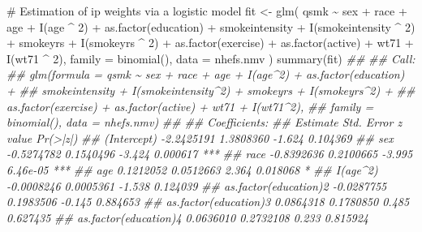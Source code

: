 \documentclass[
  10pt,
  a4paper,
]{book}
\newenvironment{Shaded}{\begin{snugshade}}{\end{snugshade}}
\newcommand{\AttributeTok}[1]{\textcolor[rgb]{0.40,0.45,0.13}{#1}}
\newcommand{\CommentTok}[1]{\textcolor[rgb]{0.37,0.37,0.37}{#1}}
\newcommand{\DecValTok}[1]{\textcolor[rgb]{0.68,0.00,0.00}{#1}}
\newcommand{\DocumentationTok}[1]{\textcolor[rgb]{0.37,0.37,0.37}{\textit{#1}}}
\newcommand{\FunctionTok}[1]{\textcolor[rgb]{0.28,0.35,0.67}{#1}}
\newcommand{\NormalTok}[1]{\textcolor[rgb]{0.00,0.46,0.62}{#1}}
\newcommand{\OtherTok}[1]{\textcolor[rgb]{0.00,0.46,0.62}{#1}}
\newcommand{\SpecialCharTok}[1]{\textcolor[rgb]{0.37,0.37,0.37}{#1}}
\begin{document}
\begin{Shaded}
\begin{Highlighting}[]
\CommentTok{\# Estimation of ip weights via a logistic model}
\NormalTok{fit }\OtherTok{\textless{}{-}} \FunctionTok{glm}\NormalTok{(}
\NormalTok{  qsmk }\SpecialCharTok{\textasciitilde{}}\NormalTok{ sex }\SpecialCharTok{+}\NormalTok{ race }\SpecialCharTok{+}\NormalTok{ age }\SpecialCharTok{+} \FunctionTok{I}\NormalTok{(age }\SpecialCharTok{\^{}} \DecValTok{2}\NormalTok{) }\SpecialCharTok{+}
    \FunctionTok{as.factor}\NormalTok{(education) }\SpecialCharTok{+}\NormalTok{ smokeintensity }\SpecialCharTok{+}
    \FunctionTok{I}\NormalTok{(smokeintensity }\SpecialCharTok{\^{}} \DecValTok{2}\NormalTok{) }\SpecialCharTok{+}\NormalTok{ smokeyrs }\SpecialCharTok{+} \FunctionTok{I}\NormalTok{(smokeyrs }\SpecialCharTok{\^{}} \DecValTok{2}\NormalTok{) }\SpecialCharTok{+}
    \FunctionTok{as.factor}\NormalTok{(exercise) }\SpecialCharTok{+} \FunctionTok{as.factor}\NormalTok{(active) }\SpecialCharTok{+}\NormalTok{ wt71 }\SpecialCharTok{+} \FunctionTok{I}\NormalTok{(wt71 }\SpecialCharTok{\^{}} \DecValTok{2}\NormalTok{),}
  \AttributeTok{family =} \FunctionTok{binomial}\NormalTok{(),}
  \AttributeTok{data =}\NormalTok{ nhefs.nmv}
\NormalTok{)}
\FunctionTok{summary}\NormalTok{(fit)}
\DocumentationTok{\#\# }
\DocumentationTok{\#\# Call:}
\DocumentationTok{\#\# glm(formula = qsmk \textasciitilde{} sex + race + age + I(age\^{}2) + as.factor(education) + }
\DocumentationTok{\#\#     smokeintensity + I(smokeintensity\^{}2) + smokeyrs + I(smokeyrs\^{}2) + }
\DocumentationTok{\#\#     as.factor(exercise) + as.factor(active) + wt71 + I(wt71\^{}2), }
\DocumentationTok{\#\#     family = binomial(), data = nhefs.nmv)}
\DocumentationTok{\#\# }
\DocumentationTok{\#\# Coefficients:}
\DocumentationTok{\#\#                         Estimate Std. Error z value Pr(\textgreater{}|z|)    }
\DocumentationTok{\#\# (Intercept)           {-}2.2425191  1.3808360  {-}1.624 0.104369    }
\DocumentationTok{\#\# sex                   {-}0.5274782  0.1540496  {-}3.424 0.000617 ***}
\DocumentationTok{\#\# race                  {-}0.8392636  0.2100665  {-}3.995 6.46e{-}05 ***}
\DocumentationTok{\#\# age                    0.1212052  0.0512663   2.364 0.018068 *  }
\DocumentationTok{\#\# I(age\^{}2)              {-}0.0008246  0.0005361  {-}1.538 0.124039    }
\DocumentationTok{\#\# as.factor(education)2 {-}0.0287755  0.1983506  {-}0.145 0.884653    }
\DocumentationTok{\#\# as.factor(education)3  0.0864318  0.1780850   0.485 0.627435    }
\DocumentationTok{\#\# as.factor(education)4  0.0636010  0.2732108   0.233 0.815924    }

\end{Highlighting}
\end{Shaded}
\end{document}
